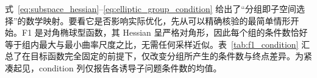 式~\eqref{eq:subspace_hessian}--\eqref{eq:elliptic_group_condition} 给出了“分组即子空间选择”的数学映射。要看它是否影响实际优化，先从可以精确核验的最简单情形开始。F1 是对角椭球型函数，其 Hessian 呈严格对角形，因此每个组的条件数恰好等于组内最大与最小曲率尺度之比，无需任何采样近似。表~\ref{tab:f1_condition} 汇总了在目标函数完全固定的前提下，仅改变分组所产生的条件数与终点差异。为紧凑起见，condition 列仅报告各诱导子问题条件数的均值。
